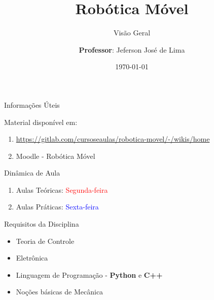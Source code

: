 \documentclass{beamer}
\title{Robótica Móvel}
\subtitle{Visão Geral}
\date{\today}
\author[Jeferson José de Lima]{
  \textbf{Professor}: Jeferson José de Lima}
\institute[UTFPR-PB]{Departamento de Informática (DAINF)}
\begin{document}
\maketitle

\begin{frame}{Informações Úteis}
	\begin{block}{Material disponível em:}
		\begin{enumerate}
			\item \href{Robótica Móvel - Wiki}{https://gitlab.com/cursoseaulas/robotica-movel/-/wikis/home}
			\item Moodle - Robótica Móvel
		\end{enumerate}
	\end{block}
	\begin{block}{Dinâmica de Aula}
		\begin{enumerate}
			\item Aulas Teóricas: \textcolor{red}{Segunda-feira}
			\item Aulas Práticas: \textcolor{blue}{Sexta-feira}
		\end{enumerate}
	\end{block}
	\begin{block}{Requisitos da Disciplina}
		\begin{itemize}
		\item Teoria de Controle
		\item Eletrônica
		\item Linguagem de Programação - \textbf{Python} e \textbf{C++}
		\item Noções básicas de Mecânica
		\end{itemize}
	\end{block}
\end{frame}
\end{document}
